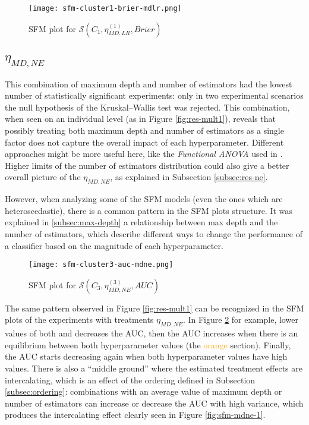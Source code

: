 \begin{figure}[H]
    \centering
    \texttt{[image: sfm-cluster1-brier-mdlr.png]}
    \caption{SFM plot for $\mathcal{S}(C_1, \eta^{(1)}_{MD, LR}, Brier)$}
    \label{fig:sfm-mdlr-2}
\end{figure}

\subsection{\texorpdfstring{\Large$\eta_{MD, NE}$}{}}

This combination of maximum depth and number of estimators had the lowest number of statistically significant experiments: only in two experimental scenarios the null hypothesis of the Kruskal–Wallis test was rejected. This combination, when seen on an individual level (as in Figure \ref{fig:res-mult1}), reveals that possibly treating both maximum depth and number of estimators as a single factor does not capture the overall impact of each hyperparameter. Different approaches might be more useful here, like the \textit{Functional ANOVA} used in \cite{van2018hyperparameter}. Higher limits of the number of estimators distribution could also give a better overall picture of the $\eta_{MD, NE}$, as explained in Subsection \ref{subsec:res-ne}.

However, when analyzing some of the SFM models (even the ones which are heteroscedastic), there is a common pattern in the SFM plots structure. It was explained in \ref{subsec:max-depth} a relationship between max depth and the number of estimators, which describe different ways to change the performance of a classifier based on the magnitude of each hyperparameter.

\begin{figure}[H]
    \centering
    \texttt{[image: sfm-cluster3-auc-mdne.png]}
    \caption{SFM plot for $\mathcal{S}(C_3, \eta^{(3)}_{MD, NE}, AUC)$}
    \label{fig:sfm-mdne-2}
\end{figure}

The same pattern observed in Figure \ref{fig:res-mult1} can be recognized in the SFM plots of the experiments with treatments $\eta_{MD, NE}$. In Figure \ref{fig:sfm-mdne-2} for example, lower values of both  and  decreases the AUC, then the AUC increases when there is an equilibrium between both hyperparameter values (the  \textcolor{orange}{orange} section). Finally, the AUC starts decreasing again when both hyperparameter values have high values. There is also a ``middle ground'' where the estimated treatment effects are intercalating, which is an effect of the ordering defined in Subsection \ref{subsec:ordering}: combinations with an average value of maximum depth or number of estimators can increase or decrease the AUC with high variance, which produces the intercalating effect clearly seen in Figure \ref{fig:sfm-mdne-1}.

